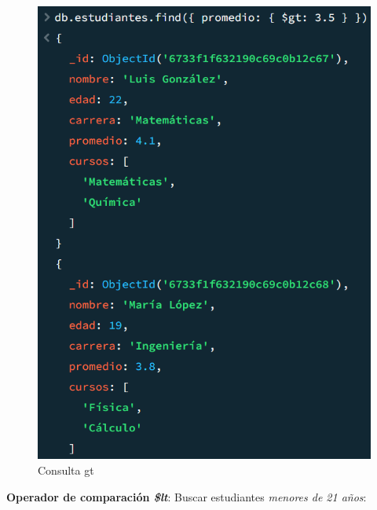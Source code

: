 \begin{figure}[H]
  \centering
  \includegraphics[scale = 0.8]{Imagenes/parte3/3.2.png}
  \caption{Consulta gt}
\end{figure}

\textbf{Operador de comparación \emph{\$lt}}: Buscar estudiantes \textit{menores de 21 años}:

